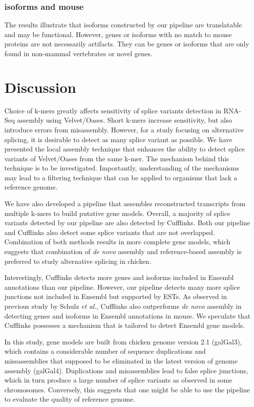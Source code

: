 \documentclass[10pt]{article}
\begin{document}
\subsubsection*{isoforms and mouse}

The results illustrate that isoforms constructed
by our pipeline are translatable and may be functional.  However,
genes or isoforms with no match to mouse proteins are not necessarily
artifacts.  They can be genes or isoforms that are only found in
non-mammal vertebrates or novel genes.


\section*{Discussion}

Choice of k-mers greatly affects sensitivity of splice variants detection in RNA-Seq assembly using Velvet/Oases.
Short k-mers increase sensitivity, but also introduce errors from misassembly.
However, for a study focusing on alternative splicing, it is desirable to detect as many splice variant as possible.
We have presented the local assembly technique that enhances the ability to detect splice variants of Velvet/Oases from the same
k-mer.
The mechanism behind this technique is to be investigated.
Importantly, understanding of the mechanisms may lead to a filtering technique that can be applied to organisms that lack a reference genome.

We have also developed a pipeline that assembles reconstructed transcripts from multiple k-mers to build putative gene models.
Overall, a majority of splice variants detected by our pipeline are also detected by Cufflinks.
Both our pipeline and Cufflinks also detect some splice variants that are not overlapped.
Combination of both methods results in more complete gene models,
which suggests that combination of \emph{de novo} assembly and reference-based assembly is preferred to study alternative splicing in chicken.

Interestingly, Cufflinks detects more genes and isoforms included in Ensembl annotations than our pipeline.
However, our pipeline detects many more splice junctions not included in Ensembl but supported by ESTs.
As observed in previous study by Schulz \emph{et al.}\cite{Schulz:2012je}, Cufflinks also outperforms \emph{de novo} assembly in
detecting genes and isoforms in Ensembl annotations in mouse.
We speculate that Cufflinks possesses a mechanism that is tailored to detect Ensembl gene models.

In this study, gene models are built from chicken genome version 2.1 (galGal3),
which contains a considerable number of sequence duplications and
missassemblies that supposed to be eliminated in the latest version of genome assembly (galGal4).
Duplications and misassemblies lead to false splice junctions, which in turn produce a large number of splice variants as
observed in some chromosomes.
Conversely, this suggests that one might be able to use the pipeline to evaluate the quality of reference genome.
\end{document}
